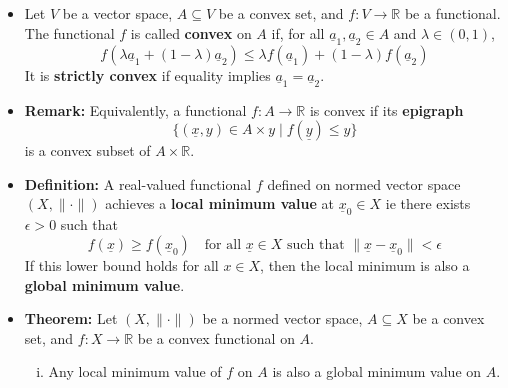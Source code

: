 \documentclass[11pt,twoside]{report}
\newcommand{\bbR}{{\mathbb{R}}}
\newcommand{\vecnot}{\underline}
\begin{document}
\begin{itemize}


\item Let $V$ be a vector space, $A \subseteq V$ be a convex set, and $f \colon V \rightarrow \bbR$ be a functional.
The functional $f$ is called \textbf{convex} on $A$ if, for all $\vecnot{a}_1,\vecnot{a}_2 \in A$ and $\lambda\in(0,1)$,
\[ f( \lambda \vecnot{a}_1 + (1-\lambda) \vecnot{a}_2 ) \leq \lambda f( \vecnot{a}_1 ) + (1-\lambda) f ( \vecnot{a}_2 )  \]
It is \textbf{strictly convex} if equality implies $\vecnot{a}_1 = \vecnot{a}_2$.

\begin{center}
\end{center}

\item \textbf{Remark:} Equivalently, a  functional $f \colon A \to \bbR$ is convex if its \textbf{epigraph}
\[
\{ (\vecnot{x}, y)  \in A \times y \mid f(\vecnot{y}) \le y\} 
\]
is a convex subset of $A \times \bbR$. 


\item \textbf{Definition:}  A real-valued functional $f$ defined on normed vector space  $(X,\|\cdot\|)$ achieves a \textbf{local minimum value} at $\vecnot{x}_0 \in X$ ie there exists  $\epsilon > 0$ such that
\[
f(\vecnot{x}) \geq f(\vecnot{x}_0) \quad \text{for all $\vecnot{x}\in X$ such that  $\| \vecnot{x} - \vecnot{x}_0 \| < \epsilon$}
\]
If this lower bound holds for all $x\in X$, then the local minimum is also a \textbf{global minimum value}.


\item \textbf{Theorem:} 
Let $(X,\|\cdot\|)$ be a normed vector space, $A \subseteq X$ be a convex set, and $f \colon X \rightarrow \bbR$ be a convex functional on $A$. 
\begin{enumerate}[(i)]

\item Any local minimum value of $f$ on $A$ is also a global minimum value on $A$.


\end{enumerate}
\end{itemize}
\end{document}
